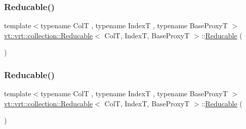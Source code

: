 \mbox{\label{structvt_1_1vrt_1_1collection_1_1_reducable_aafc682961c7c961547d91358cda46792}} 
\subsubsection{\texorpdfstring{Reducable()}{Reducable()}\hspace{0.1cm}{\footnotesize\ttfamily [2/4]}}
{\footnotesize\ttfamily template$<$typename ColT , typename IndexT , typename Base\+ProxyT $>$ \\
\hyperlink{structvt_1_1vrt_1_1collection_1_1_reducable}{vt\+::vrt\+::collection\+::\+Reducable}$<$ ColT, IndexT, Base\+ProxyT $>$\+::\hyperlink{structvt_1_1vrt_1_1collection_1_1_reducable}{Reducable} (\begin{DoxyParamCaption}\item[{\hyperlink{structvt_1_1vrt_1_1collection_1_1_reducable}{Reducable}$<$ ColT, IndexT, Base\+ProxyT $>$ const \&}]{ }\end{DoxyParamCaption})\hspace{0.3cm}{\ttfamily [default]}}

\mbox{\label{structvt_1_1vrt_1_1collection_1_1_reducable_a4c5250ba5364ae0965c119773e87f4e8}} 
\subsubsection{\texorpdfstring{Reducable()}{Reducable()}\hspace{0.1cm}{\footnotesize\ttfamily [3/4]}}
{\footnotesize\ttfamily template$<$typename ColT , typename IndexT , typename Base\+ProxyT $>$ \\
\hyperlink{structvt_1_1vrt_1_1collection_1_1_reducable}{vt\+::vrt\+::collection\+::\+Reducable}$<$ ColT, IndexT, Base\+ProxyT $>$\+::\hyperlink{structvt_1_1vrt_1_1collection_1_1_reducable}{Reducable} (\begin{DoxyParamCaption}\item[{\hyperlink{structvt_1_1vrt_1_1collection_1_1_reducable}{Reducable}$<$ ColT, IndexT, Base\+ProxyT $>$ \&\&}]{ }\end{DoxyParamCaption})\hspace{0.3cm}{\ttfamily [default]}}

